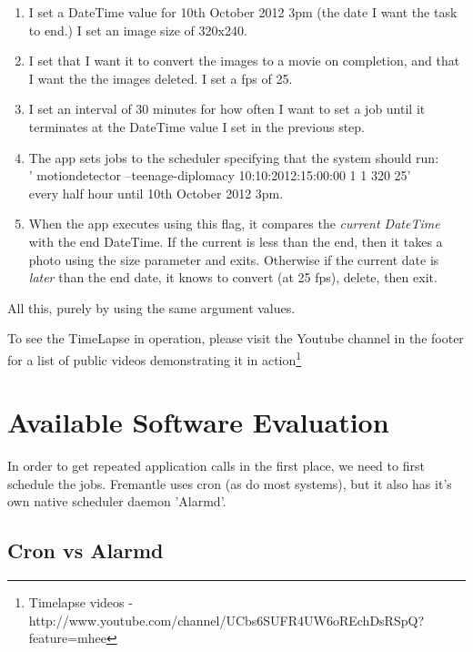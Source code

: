 \begin{enumerate}
\item I set a DateTime value for 10th October 2012 3pm (the date I want the task to end.)  I set an image size of 320x240.\\
\vspace{-20pt}
\item I set that I want it to convert the images to a movie on completion, and that I want the the images deleted. I set a fps of 25.\\
\vspace{-20pt}
\item I set an interval of 30 minutes for how often I want to set a job until it terminates at the DateTime value I set in the previous step.\\
\vspace{-20pt}
\item The app sets jobs to the scheduler specifying that the system should run:\\
 ' motiondetector --teenage-diplomacy 10:10:2012:15:00:00   1  1  320 25' \\
every half hour until 10th October 2012 3pm.
\vspace{-8pt}
\item When the app executes using this flag, it compares the {\it current DateTime} with the end DateTime. If the current is less than the end, then it takes a photo using the size parameter and exits. Otherwise if the current date is {\it later} than the end date, it knows to convert (at 25 fps), delete, then exit.
\end{enumerate}
All this, purely by using the same argument values.

To see the TimeLapse in operation, please visit the Youtube channel in the footer for a list of public videos demonstrating it in action\footnote{Timelapse videos - http://www.youtube.com/channel/UCbs6SUFR4UW6oREchDsRSpQ?feature=mhee}\label{ref:mickey}

\section{Available Software Evaluation}
In order to get repeated application calls in the first place, we need to first schedule the jobs. Fremantle uses cron (as do most systems), but it also has it's own native scheduler daemon 'Alarmd'.

\subsection{Cron vs Alarmd}
